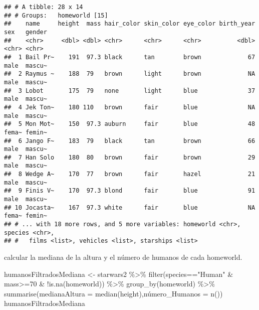 \documentclass[
]{book}
\newenvironment{Shaded}{\begin{snugshade}}{\end{snugshade}}
\newcommand{\AttributeTok}[1]{\textcolor[rgb]{0.77,0.63,0.00}{#1}}
\newcommand{\DecValTok}[1]{\textcolor[rgb]{0.00,0.00,0.81}{#1}}
\newcommand{\FunctionTok}[1]{\textcolor[rgb]{0.00,0.00,0.00}{#1}}
\newcommand{\NormalTok}[1]{#1}
\newcommand{\OtherTok}[1]{\textcolor[rgb]{0.56,0.35,0.01}{#1}}
\newcommand{\SpecialCharTok}[1]{\textcolor[rgb]{0.00,0.00,0.00}{#1}}
\newcommand{\StringTok}[1]{\textcolor[rgb]{0.31,0.60,0.02}{#1}}
\begin{document}
\begin{verbatim}
## # A tibble: 28 x 14
## # Groups:   homeworld [15]
##    name     height  mass hair_color skin_color eye_color birth_year sex   gender
##    <chr>     <dbl> <dbl> <chr>      <chr>      <chr>          <dbl> <chr> <chr> 
##  1 Bail Pr~    191  97.3 black      tan        brown             67 male  mascu~
##  2 Raymus ~    188  79   brown      light      brown             NA male  mascu~
##  3 Lobot       175  79   none       light      blue              37 male  mascu~
##  4 Jek Ton~    180 110   brown      fair       blue              NA male  mascu~
##  5 Mon Mot~    150  97.3 auburn     fair       blue              48 fema~ femin~
##  6 Jango F~    183  79   black      tan        brown             66 male  mascu~
##  7 Han Solo    180  80   brown      fair       brown             29 male  mascu~
##  8 Wedge A~    170  77   brown      fair       hazel             21 male  mascu~
##  9 Finis V~    170  97.3 blond      fair       blue              91 male  mascu~
## 10 Jocasta~    167  97.3 white      fair       blue              NA fema~ femin~
## # ... with 18 more rows, and 5 more variables: homeworld <chr>, species <chr>,
## #   films <list>, vehicles <list>, starships <list>
\end{verbatim}

calcular la mediana de la altura y el número de humanos de cada homeworld.

\begin{Shaded}
\begin{Highlighting}[]
\NormalTok{humanosFiltradosMediana }\OtherTok{\textless{}{-}}\NormalTok{  starwars2 }\SpecialCharTok{\%\textgreater{}\%} \FunctionTok{filter}\NormalTok{(species}\SpecialCharTok{==}\StringTok{"Human"} \SpecialCharTok{\&}\NormalTok{ mass}\SpecialCharTok{\textgreater{}=}\DecValTok{70} \SpecialCharTok{\&} \SpecialCharTok{!}\FunctionTok{is.na}\NormalTok{(homeworld)) }\SpecialCharTok{\%\textgreater{}\%} \FunctionTok{group\_by}\NormalTok{(homeworld) }\SpecialCharTok{\%\textgreater{}\%} \FunctionTok{summarise}\NormalTok{(}\AttributeTok{medianaAltura =} \FunctionTok{median}\NormalTok{(height),número}\AttributeTok{\_Humanos =} \FunctionTok{n}\NormalTok{())}
\NormalTok{humanosFiltradosMediana}
\end{Highlighting}
\end{Shaded}
\end{document}
